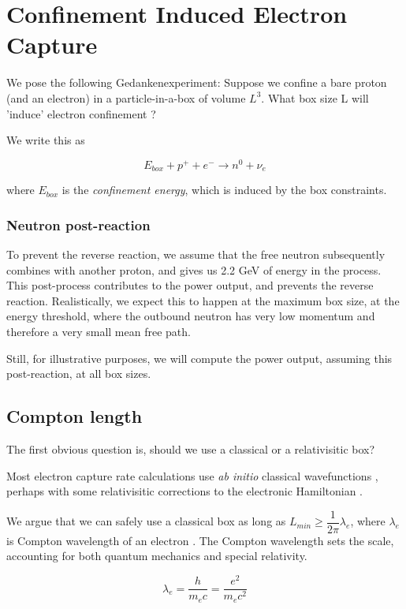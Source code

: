 \documentclass[%
 aip,
 jmp,%
 amsmath,amssymb,
 reprint,%
]{revtex4-1}
\begin{document}
\section{Confinement Induced Electron Capture}

We pose the following Gedankenexperiment:   Suppose we confine a bare proton (and an electron) in a particle-in-a-box of volume $L^3$.  What box size L will 'induce' electron confinement ?

We write this as

$$E_{box}+p^{+}+e^{-}\rightarrow n^{0}+\nu_{e}$$

where $E_{box}$ is the \emph{confinement energy}, which is induced by the box constraints. 

\subsubsection{Neutron post-reaction}

To prevent the reverse reaction, we assume that the free neutron subsequently combines with another proton, and gives us 2.2 GeV of energy in the process.  This post-process contributes to the power output, and prevents the reverse reaction.  Realistically, we expect this to happen at the maximum box size, at the energy threshold, where the outbound neutron has very low momentum and therefore a very small mean free path.  

Still, for illustrative purposes, we will compute the power output,  assuming this post-reaction,  at all box sizes.

\subsection{Compton length}
The first obvious question is, should we use a classical or a relativisitic box?   

Most electron capture rate calculations use \emph{ab initio} classical wavefunctions \cite{ec-review1,ec-review2}, perhaps with some relativisitic corrections to the electronic Hamiltonian \cite{martin}.

We argue that we can safely use a classical box as long as $L_{min} \ge \dfrac{1}{2\pi}\lambda_{e}$, where $\lambda_{e}$ is Compton wavelength of an electron \cite{relbox,compton,planck}.  The Compton wavelength sets the scale, accounting for both quantum mechanics and special relativity.

$$\lambda_{e}=\dfrac{h}{m_{e}c}=\dfrac{e^{2}}{m_{e}c^{2}}$$
\end{document}
